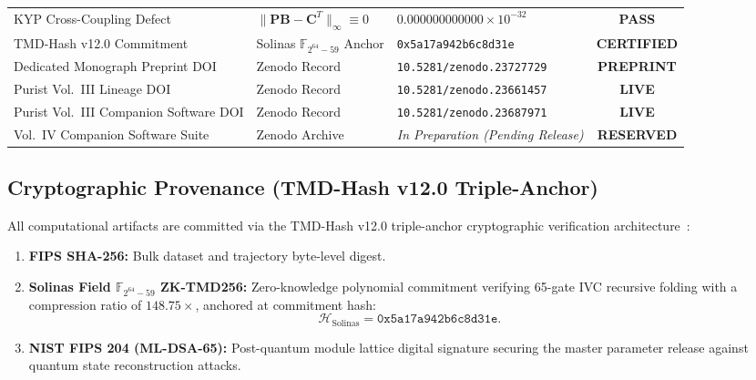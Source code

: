 \documentclass[11pt,a4paper,reqno]{article}
\theoremstyle{plain}
\theoremstyle{definition}
\theoremstyle{remark}
\numberwithin{equation}{section}
\begin{document}
\begin{table}[htbp]
\begin{tabularx}{\textwidth}{@{}P{4.2cm} Y Y c@{}}
KYP Cross-Coupling Defect & $\|\mathbf{P}\mathbf{B} - \mathbf{C}^T\|_\infty \equiv 0$ & $0.000000000000 \times 10^{-32}$ & \textbf{PASS} \\
TMD-Hash v12.0 Commitment & Solinas $\mathbb{F}_{2^{64}-59}$ Anchor & \texttt{0x5a17a942b6c8d31e} & \textbf{CERTIFIED} \\
Dedicated Monograph Preprint DOI & Zenodo Record & \texttt{10.5281/zenodo.23727729} & \textbf{PREPRINT} \\
Purist Vol.~III Lineage DOI & Zenodo Record & \texttt{10.5281/zenodo.23661457} & \textbf{LIVE} \\
Purist Vol.~III Companion Software DOI & Zenodo Record & \texttt{10.5281/zenodo.23687971} & \textbf{LIVE} \\
Vol.~IV Companion Software Suite & Zenodo Archive & \textit{In Preparation (Pending Release)} & \textbf{RESERVED} \\
\bottomrule
\end{tabularx}
\end{table}

\subsection{Cryptographic Provenance (TMD-Hash v12.0 Triple-Anchor)}
\label{subsec:cryptographic_provenance}
All computational artifacts are committed via the TMD-Hash v12.0 triple-anchor cryptographic verification architecture~\cite{TMDHashV12_2026}:
\begin{enumerate}[label=\textbf{(\arabic*)}, leftmargin=2.2em]
  \item \textbf{FIPS SHA-256:} Bulk dataset and trajectory byte-level digest.
  \item \textbf{Solinas Field $\mathbb{F}_{2^{64}-59}$ ZK-TMD256:} Zero-knowledge polynomial commitment verifying 65-gate IVC recursive folding with a compression ratio of $148.75\times$, anchored at commitment hash:
  \begin{equation}
    \mathcal{H}_{\mathrm{Solinas}} = \mathtt{0x5a17a942b6c8d31e}.
  \end{equation}
  \item \textbf{NIST FIPS 204 (ML-DSA-65):} Post-quantum module lattice digital signature securing the master parameter release against quantum state reconstruction attacks.
\end{enumerate}

\end{document}
